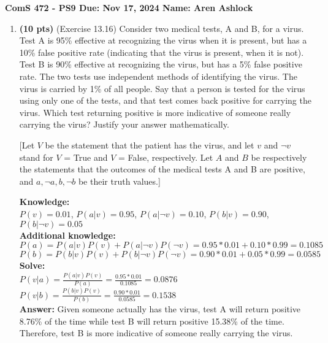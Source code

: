 \documentclass{article}
\begin{document}
\noindent\textbf{ComS 472 - PS9 \quad Due: Nov 17, 2024 \quad Name: Aren Ashlock}

\begin{enumerate}


\item \textbf{(10 pts)} (Exercise 13.16) Consider two medical tests, A and B, for a virus. Test A is 95\% effective at recognizing the virus when it is present, but has a 10\% false positive rate (indicating that the virus is present, when it is not). Test B is 90\% effective at recognizing the virus, but has a 5\% false positive rate. The two tests use independent methods of identifying the virus. The virus is carried by 1\% of all people. Say that a person is tested for the virus using only one of the tests, and that test comes back positive for carrying the virus. Which test returning positive is more indicative of someone really carrying the virus? Justify your answer mathematically.

[Let $V$ be the statement that the patient has the virus, and let $v$ and $\neg v$ stand for $V$ = True and $V$ = False, respectively. Let $A$ and $B$ be respectively the statements that the outcomes of the medical tests A and B are positive, and $a, \neg a, b, \neg b$ be their truth values.]

\color{blue}
    \textbf{Knowledge:}\\
    $P(v) = 0.01$, $P(a|v) = 0.95$, $P(a|\neg v)=0.10$, $P(b|v)=0.90$, $P(b|\neg v)=0.05$\\
    \textbf{Additional knowledge:}\\
    $P(a)=P(a|v)P(v)+P(a|\neg v)P(\neg v)=0.95*0.01+0.10*0.99=0.1085$\\
    $P(b)=P(b|v)P(v)+P(b|\neg v)P(\neg v)=0.90*0.01+0.05*0.99=0.0585$\\
    \textbf{Solve:}\\
    $P(v|a)=\frac{P(a|v)P(v)}{P(a)}=\frac{0.95*0.01}{0.1085}=0.0876$\\
    $P(v|b)=\frac{P(b|v)P(v)}{P(b)}=\frac{0.90*0.01}{0.0585}=0.1538$\\
    \textbf{Answer:} Given someone actually has the virus, test A will return positive 8.76\% of the time while test B will return positive 15.38\% of the time. Therefore, test B is more indicative of someone really carrying the virus.
\color{black}



\end{enumerate}
\end{document}

